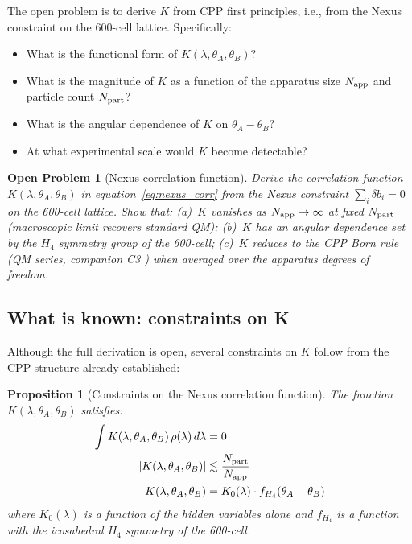 \documentclass[11pt,a4paper]{article}
\newtheorem{proposition}[theorem]{Proposition}
\newtheorem{openprob}[theorem]{Open Problem}
\begin{document}
The open problem is to derive $K$ from CPP first principles, i.e.,
from the Nexus constraint on the 600-cell lattice.  Specifically:
\begin{itemize}
\item What is the functional form of $K(\lambda, \theta_A, \theta_B)$?
\item What is the magnitude of $K$ as a function of the apparatus
  size $N_{\rm app}$ and particle count $N_{\rm part}$?
\item What is the angular dependence of $K$ on $\theta_A - \theta_B$?
\item At what experimental scale would $K$ become detectable?
\end{itemize}

\begin{openprob}[Nexus correlation function]
\label{op:nexus}
Derive the correlation function $K(\lambda, \theta_A, \theta_B)$
in equation~\eqref{eq:nexus_corr} from the Nexus constraint
$\sum_i \delta b_i = 0$ on the 600-cell lattice.  Show that:
(a)~$K$ vanishes as $N_{\rm app} \to \infty$ at fixed $N_{\rm part}$
(macroscopic limit recovers standard QM); (b)~$K$ has an angular
dependence set by the $H_4$ symmetry group of the 600-cell;
(c)~$K$ reduces to the CPP Born rule (QM series, companion C3
\citep{cpp2040c}) when averaged over the apparatus degrees of freedom.
\end{openprob}

\subsection{What is known: constraints on K}

Although the full derivation is open, several constraints on $K$
follow from the CPP structure already established:

\begin{proposition}[Constraints on the Nexus correlation function]
\label{prop:constraints}
The function $K(\lambda, \theta_A, \theta_B)$ satisfies:
\begin{align}
\int K(\lambda, \theta_A, \theta_B)\,\rho(\lambda)\,d\lambda &= 0
\label{eq:K_zero_mean} \\
|K(\lambda, \theta_A, \theta_B)| &\lesssim \frac{N_{\rm part}}{N_{\rm app}}
\label{eq:K_magnitude} \\
K(\lambda, \theta_A, \theta_B) &= K_0(\lambda) \cdot
f_{H_4}(\theta_A - \theta_B)
\label{eq:K_factored}
\end{align}
where $K_0(\lambda)$ is a function of the hidden variables alone and
$f_{H_4}$ is a function with the icosahedral $H_4$ symmetry of the
600-cell.
\end{proposition}
\end{document}
